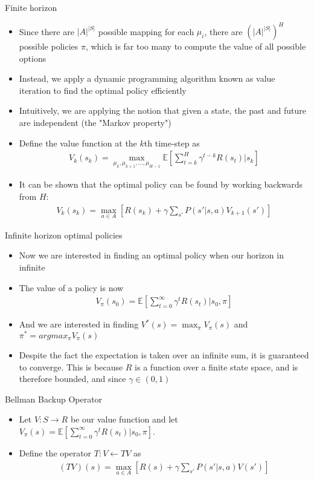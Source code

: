 \documentclass[10pt,mathserif]{beamer}
\begin{document}
\begin{frame}{Finite horizon}
\begin{itemize}
\item Since there are $|A|^{|S|}$ possible mapping for each $\mu_i$, there are $(|A|^{|S|})^H$ possible policies $\pi$, which is far too many to compute the value of all possible options
\item Instead, we apply a dynamic programming algorithm known as value iteration to find the optimal policy efficiently
\item Intuitively, we are applying the notion that given a state, the past and future are independent (the "Markov property")
\item Define the value function at the $k$th time-step as
\begin{align}
V_k(s_k) = \max_{\mu_k, \mu_{k+1}, \dots, \mu_{H-1}} \mathbb{E}[\sum_{t=k}^H\gamma^{t-k}R(s_t)|s_k]
\end{align}
\item It can be shown that the optimal policy can be found by working backwards from $H$:
\begin{align}
V_k(s_k) = \max_{a\in A}[R(s_k) + \gamma\sum_{s'}P(s'|s,a)V_{k+1}(s')]
\end{align}
\end{itemize}
\end{frame}


\begin{frame}{Infinite horizon optimal policies}
\begin{itemize}
\item Now we are interested in finding an optimal policy when our horizon in infinite
\item The value of a policy is now
\begin{align}
V_{\pi}(s_0) = \mathbb{E}[\sum_{t=0}^{\infty}\gamma^tR(s_t)|s_0,\pi]
\end{align}
\item And we are interested in finding $V^*(s) = \max_{\pi}V_{\pi}(s)$ and $\pi^* = argmax_{\pi}V_{\pi}(s)$
\item Despite the fact the expectation is taken over an infinite sum, it is guaranteed to converge.
This is because $R$ is a function over a finite state space, and is therefore bounded, and since $\gamma \in(0,1)$
\end{itemize}
\end{frame}

\begin{frame}{Bellman Backup Operator}
\begin{itemize}
\item Let $V:S\rightarrow R$ be our value function and let $V_{\pi}(s) = \mathbb{E}[\sum_{t=0}^{\infty}\gamma^tR(s_t)|s_0,\pi]$.
\item Define the operator $T:V\leftarrow TV$ as
\begin{align}
(TV)(s) = \max_{a\in A}[R(s) + \gamma\sum_{s'}P(s'|s,a)V(s')]
\end{align}
\end{itemize}
\end{frame}
\end{document}
